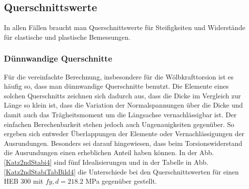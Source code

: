 {\textcolor{sectionTitleBlue}{\subsection{Querschnittswerte }}}
In allen F\"{a}llen braucht man Querschnittswerte f\"{u}r Steifigkeiten und Widerst\"{a}nde f\"{u}r elastische und plastische Bemessungen.

{\textcolor{sectionTitleBlue}{\subsubsection*{D\"{u}nnwandige Querschnitte }}}
F\"{u}r die vereinfachte Berechnung, insbesondere f\"{u}r die W\"{o}lbkrafttorsion ist es h\"{a}ufig so, dass man d\"{u}nnwandige Querschnitte benutzt. Die Elemente eines solchen Querschnitts zeichnen sich dadurch aus, dass die Dicke im Vergleich zur L\"{a}nge so klein ist, dass die Variation der Normalspannungen \"{u}ber die Dicke und damit auch das Tr\"{a}gheitsmoment um die L\"{a}ngsachse vernachl\"{a}ssigbar ist. Der einfachen Berechenbarkeit stehen jedoch auch Un\-ge\-nauigkeiten gegen\"{u}ber. So ergeben sich entweder \"{U}berlappungen der Elemente oder Vernachl\"{a}ssigungen der Ausrundungen. Besonders sei darauf hingewiesen, dass beim Torsionswiderstand die Ausrundungen einen erheblichen Anteil haben k\"{o}nnen. In der Abb. \ref{Katz2ndStabi4} sind f\"{u}nf Idealisierungen und in der Tabelle in Abb. \ref{Katz2ndStabiTabBild4} die Unterschiede bei den Querschnittswerten f\"{u}r einen HEB 300 mit $fy,d=218.2$ MPa gegen\"{u}ber gestellt.\\

